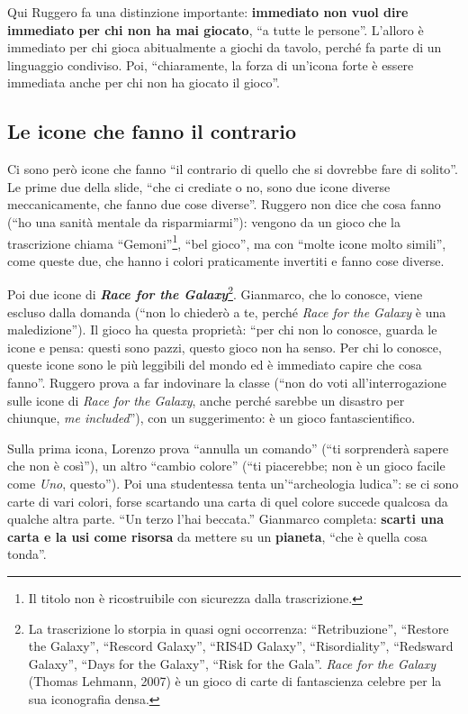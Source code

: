 Qui Ruggero fa una distinzione importante: \textbf{immediato non vuol dire immediato
per chi non ha mai giocato}, ``a tutte le persone''. L'alloro è immediato per chi gioca
abitualmente a giochi da tavolo, perché fa parte di un linguaggio condiviso. Poi,
``chiaramente, la forza di un'icona forte è essere immediata anche per chi non ha
giocato il gioco''.

\subsection{Le icone che fanno il contrario}



Ci sono però icone che fanno ``il contrario di quello che si dovrebbe fare di solito''.
Le prime due della slide, ``che ci crediate o no, sono due icone diverse
meccanicamente, che fanno due cose diverse''. Ruggero non dice che cosa fanno (``ho una
sanità mentale da risparmiarmi''): vengono da un gioco che la trascrizione chiama
``Gemoni''\footnote{Il titolo non è ricostruibile con sicurezza dalla trascrizione.},
``bel gioco'', ma con ``molte icone molto simili'', come queste due, che hanno i colori
praticamente invertiti e fanno cose diverse.

Poi due icone di \textbf{\emph{Race for the Galaxy}}\footnote{La trascrizione lo
storpia in quasi ogni occorrenza: ``Retribuzione'', ``Restore the Galaxy'', ``Rescord
Galaxy'', ``RIS4D Galaxy'', ``Risordiality'', ``Redsward Galaxy'', ``Days for the
Galaxy'', ``Risk for the Gala''. \emph{Race for the Galaxy} (Thomas Lehmann, 2007) è un
gioco di carte di fantascienza celebre per la sua iconografia densa.}. Gianmarco, che
lo conosce, viene escluso dalla domanda (``non lo chiederò a te, perché \emph{Race for
the Galaxy} è una maledizione''). Il gioco ha questa proprietà: ``per chi non lo
conosce, guarda le icone e pensa: questi sono pazzi, questo gioco non ha senso. Per
chi lo conosce, queste icone sono le più leggibili del mondo ed è immediato capire che
cosa fanno''. Ruggero prova a far indovinare la classe (``non do voti
all'interrogazione sulle icone di \emph{Race for the Galaxy}, anche perché sarebbe un
disastro per chiunque, \emph{me included}''), con un suggerimento: è un gioco
fantascientifico.

Sulla prima icona, Lorenzo prova ``annulla un comando'' (``ti sorprenderà sapere che
non è così''), un altro ``cambio colore'' (``ti piacerebbe; non è un gioco facile come
\emph{Uno}, questo''). Poi una studentessa tenta un'``archeologia ludica'': se ci sono
carte di vari colori, forse scartando una carta di quel colore succede qualcosa da
qualche altra parte. ``Un terzo l'hai beccata.'' Gianmarco completa: \textbf{scarti una
carta e la usi come risorsa} da mettere su un \textbf{pianeta}, ``che è quella cosa
tonda''.

